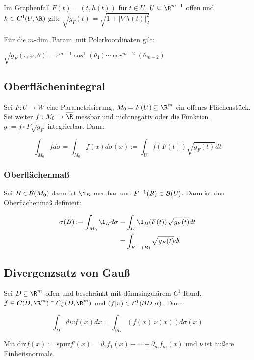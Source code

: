 Im Graphenfall $F(t) = (t,h(t))$ für $t \in U$, $U \subseteq \R^{m-1}$ offen und $h \in C^1(U,\R)$ gilt: $\sqrt{g_F(t)} = \sqrt{1+|\nabla h(t)|_2^2}$

\spacing

Für die $m$-dim. Param. mit Polarkoordinaten gilt:

$\sqrt{g_F(r,\varphi,\theta)} = r^{m-1} \cos^1(\theta_1) \cdots \cos^{m-2}(\theta_{m-2})$

\subsection*{Oberflächenintegral}

Sei $F : U \to W$ eine Parametrisierung, $M_0 = F(U) \subseteq \R^m$ ein offenes Flächenstück. Sei weiter $f : M_0 \to \overline\R$ messbar und nichtnegativ oder die Funktion $g := f \circ F \sqrt{g_F}$ integrierbar. Dann:

\vspace{-4mm}
$$\int_{M_0} f d\sigma = \int_{M_0} f(x) d\sigma(x) := \int_U f(F(t))\sqrt{g_F(t)} dt$$

\subsubsection*{Oberflächenmaß}

Sei $B \in \mathcal{B}(M_0)$ dann ist $\1_B$ messbar und $F^{-1}(B) \in \mathcal{B}(U)$. Dann ist das Oberflächenmaß definiert:

\vspace{-4mm}
\begin{align*}
\sigma(B) := \int_{M_0} \1_B d\sigma &= \int_U \1_B(F(t)) \sqrt{g_F(t)} dt\\
                             &= \int_{F^{-1}(B)} \sqrt{g_F(t)} dt
\end{align*}

\subsection*{Divergenzsatz von Gauß}

Sei $D \subseteq \R^m$ offen und beschränkt mit dünnsingulärem $C^1$-Rand, $f \in C(D,\R^m) \cap C_b^1(D,\R^m)$ und $(f|\nu) \in \mathcal{L}^1(\partial D,\sigma)$. Dann:

$$\int_D div f(x) dx = \int_{\partial D} (f(x)|\nu(x)) d\sigma(x)$$

Mit $\text{div} f(x) := \text{spur} f'(x) = \partial_1 f_1(x) + \cdots + \partial_m f_m(x)$ und $\nu$ ist äußere Einheitsnormale.

